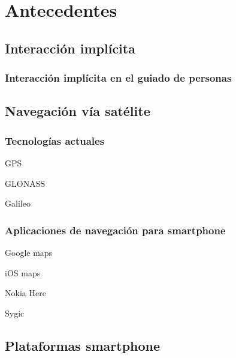 \chapter{Antecedentes}
\label{chap:antecedentes}

\section{Interacción implícita}


\subsection{Interacción implícita en el guiado de personas}


\section{Navegación vía satélite}


\subsection{Tecnologías actuales}


\begin{definitionlist}
  \item[GPS]

  \item[GLONASS]

  \item[Galileo]

\end{definitionlist}


\subsection{Aplicaciones de navegación para smartphone}


\begin{definitionlist}
  \item[Google maps] 

  \item[iOS maps]

  \item[Nokia Here]

  \item[Sygic]

\end{definitionlist}

\section{Plataformas smartphone}


